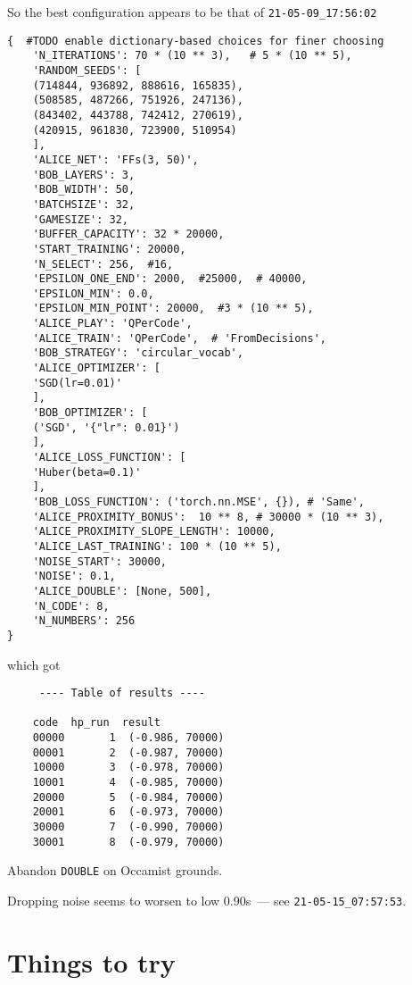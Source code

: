 \documentclass[12pt]{article}
\begin{document}
So the best configuration appears to be that of \verb|21-05-09_17:56:02|
\begin{lstlisting}
{  #TODO enable dictionary-based choices for finer choosing
	'N_ITERATIONS': 70 * (10 ** 3),   # 5 * (10 ** 5),
	'RANDOM_SEEDS': [
	(714844, 936892, 888616, 165835),
	(508585, 487266, 751926, 247136),
	(843402, 443788, 742412, 270619),
	(420915, 961830, 723900, 510954)
	],
	'ALICE_NET': 'FFs(3, 50)',
	'BOB_LAYERS': 3,
	'BOB_WIDTH': 50,
	'BATCHSIZE': 32,
	'GAMESIZE': 32,
	'BUFFER_CAPACITY': 32 * 20000,
	'START_TRAINING': 20000,
	'N_SELECT': 256,  #16,
	'EPSILON_ONE_END': 2000,  #25000,  # 40000,
	'EPSILON_MIN': 0.0,
	'EPSILON_MIN_POINT': 20000,  #3 * (10 ** 5),
	'ALICE_PLAY': 'QPerCode',
	'ALICE_TRAIN': 'QPerCode',  # 'FromDecisions',
	'BOB_STRATEGY': 'circular_vocab',
	'ALICE_OPTIMIZER': [
	'SGD(lr=0.01)'
	],
	'BOB_OPTIMIZER': [
	('SGD', '{"lr": 0.01}')
	],
	'ALICE_LOSS_FUNCTION': [
	'Huber(beta=0.1)'
	],
	'BOB_LOSS_FUNCTION': ('torch.nn.MSE', {}), # 'Same',
	'ALICE_PROXIMITY_BONUS':  10 ** 8, # 30000 * (10 ** 3),
	'ALICE_PROXIMITY_SLOPE_LENGTH': 10000,
	'ALICE_LAST_TRAINING': 100 * (10 ** 5),
	'NOISE_START': 30000,
	'NOISE': 0.1,
	'ALICE_DOUBLE': [None, 500],
	'N_CODE': 8,
	'N_NUMBERS': 256
}
\end{lstlisting}
which got
\begin{lstlisting}
	 ---- Table of results ----
	
	code  hp_run  result
	00000       1  (-0.986, 70000)
	00001       2  (-0.987, 70000)
	10000       3  (-0.978, 70000)
	10001       4  (-0.985, 70000)
	20000       5  (-0.984, 70000)
	20001       6  (-0.973, 70000)
	30000       7  (-0.990, 70000)
	30001       8  (-0.979, 70000)
\end{lstlisting}
Abandon \verb|DOUBLE| on Occamist grounds.

Dropping noise seems to worsen to low 0.90s~--- see \verb|21-05-15_07:57:53|.

\section{Things to try}
\end{document}
